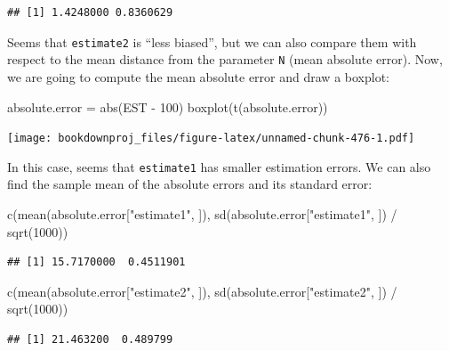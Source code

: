 \documentclass[
]{book}
\newenvironment{Shaded}{\begin{snugshade}}{\end{snugshade}}
\newcommand{\DecValTok}[1]{\textcolor[rgb]{0.00,0.00,0.81}{#1}}
\newcommand{\FunctionTok}[1]{\textcolor[rgb]{0.00,0.00,0.00}{#1}}
\newcommand{\NormalTok}[1]{#1}
\newcommand{\OtherTok}[1]{\textcolor[rgb]{0.56,0.35,0.01}{#1}}
\newcommand{\SpecialCharTok}[1]{\textcolor[rgb]{0.00,0.00,0.00}{#1}}
\newcommand{\StringTok}[1]{\textcolor[rgb]{0.31,0.60,0.02}{#1}}
\theoremstyle{definition}
\theoremstyle{definition}
\theoremstyle{definition}
\theoremstyle{definition}
\theoremstyle{remark}
\begin{document}
\begin{verbatim}
## [1] 1.4248000 0.8360629
\end{verbatim}

Seems that \texttt{estimate2} is ``less biased'', but we can also compare them with respect to the mean distance from the parameter \texttt{N} (mean absolute error). Now, we are going to compute the mean absolute error and draw a boxplot:

\begin{Shaded}
\begin{Highlighting}[]
\NormalTok{absolute.error }\OtherTok{=} \FunctionTok{abs}\NormalTok{(EST }\SpecialCharTok{{-}} \DecValTok{100}\NormalTok{)}
\FunctionTok{boxplot}\NormalTok{(}\FunctionTok{t}\NormalTok{(absolute.error))}
\end{Highlighting}
\end{Shaded}

\texttt{[image: bookdownproj\_files/figure-latex/unnamed-chunk-476-1.pdf]}

In this case, seems that \texttt{estimate1} has smaller estimation errors. We can also find the sample mean of the absolute errors and its standard error:

\begin{Shaded}
\begin{Highlighting}[]
\FunctionTok{c}\NormalTok{(}\FunctionTok{mean}\NormalTok{(absolute.error[}\StringTok{"estimate1"}\NormalTok{, ]), }\FunctionTok{sd}\NormalTok{(absolute.error[}\StringTok{"estimate1"}\NormalTok{, ]) }\SpecialCharTok{/} \FunctionTok{sqrt}\NormalTok{(}\DecValTok{1000}\NormalTok{))}
\end{Highlighting}
\end{Shaded}

\begin{verbatim}
## [1] 15.7170000  0.4511901
\end{verbatim}

\begin{Shaded}
\begin{Highlighting}[]
\FunctionTok{c}\NormalTok{(}\FunctionTok{mean}\NormalTok{(absolute.error[}\StringTok{"estimate2"}\NormalTok{, ]), }\FunctionTok{sd}\NormalTok{(absolute.error[}\StringTok{"estimate2"}\NormalTok{, ]) }\SpecialCharTok{/} \FunctionTok{sqrt}\NormalTok{(}\DecValTok{1000}\NormalTok{))}
\end{Highlighting}
\end{Shaded}

\begin{verbatim}
## [1] 21.463200  0.489799
\end{verbatim}
\end{document}
